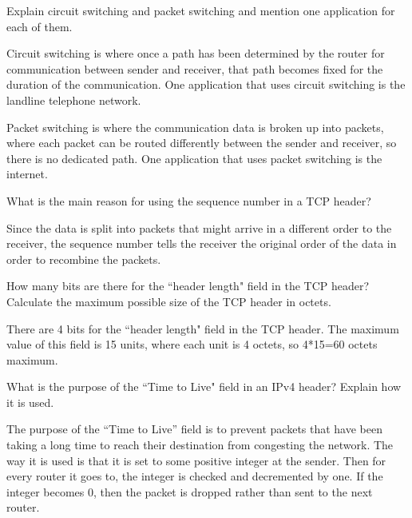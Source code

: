 \documentclass[12pt]{article}
\newenvironment{problem}[2][Problem]{\begin{trivlist}
\item[\hskip \labelsep {\bfseries #1}\hskip \labelsep {\bfseries #2.}]}{\end{trivlist}}
\begin{document}
\begin{problem}{2}
Explain circuit switching and packet switching and mention one application for each of them.

Circuit switching is where once a path has been determined by the router for communication between sender and receiver, that path becomes fixed for the duration of the communication.
One application that uses circuit switching is the landline telephone network.

Packet switching is where the communication data is broken up into packets, where each packet can be routed differently between the sender and receiver, so there is no dedicated path.
One application that uses packet switching is the internet.
\end{problem} 

\begin{problem}{3}
What is the main reason for using the sequence number in a TCP header?

Since the data is split into packets that might arrive in a different order to the receiver, the sequence number tells the receiver the original order of the data in order to recombine the packets.
\end{problem}

\begin{problem}{4}
How many bits are there for the ``header length" field in the TCP header? Calculate the maximum possible size of the TCP header in octets.

There are 4 bits for the ``header length" field in the TCP header. The maximum value of this field is 15 units, where each unit is 4 octets, so 4*15=60 octets maximum.
\end{problem}

\begin{problem}{5}
What is the purpose of the ``Time to Live" field in an IPv4 header? Explain how it is used.

The purpose of the ``Time to Live'' field is to prevent packets that have been taking a long time to reach their destination from congesting the network. The way it is used is that it is set to some positive integer at the sender. Then for every router it goes to, the integer is checked and decremented by one.
If the integer becomes 0, then the packet is dropped rather than sent to the next router.
\end{problem}

 
\end{document}
